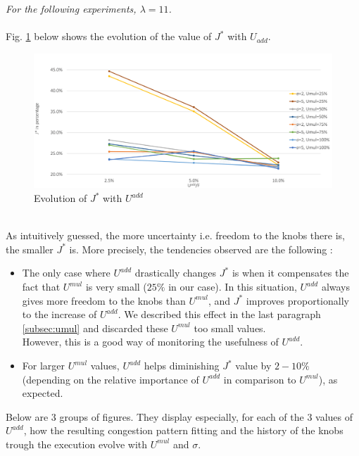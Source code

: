 \emph{For the following experiments, $\lambda=11$.}\\
\\
Fig. \ref{fig:uaddevolution} below shows the evolution of the value of $J^{*}$ with $U_{add}$.\\
\begin{figure}[h]
	\label{fig:uaddevolution}
	\caption{Evolution of $J^{*}$ with $U^{add}$}
	\includegraphics[width=7in]{figures/uadd.png}
\end{figure}
\\
As intuitively guessed, the more uncertainty i.e. freedom to the knobs there is, the smaller $J^{*}$ is.
More precisely, the tendencies observed are the following :\\
\begin{itemize}
	\item The only case where $U^{add}$ drastically changes $J^{*}$ is when it compensates the fact that $U^{mul}$ is very small ($25\% $ in our case). In this situation, $U^{add}$ always gives more freedom to the knobs than $U^{mul}$, and $J^{*}$ improves proportionally to the increase of $U^{add}$. We described this effect in the last paragraph \ref{subsec:umul} and discarded these $U^{mul}$ too small values.\\
However, this is a good way of monitoring the usefulness of $U^{add}$.
	\item For larger $U^{mul}$ values, $U^{add}$ helps diminishing $J^{*}$ value by $2-10 \% $ (depending on the relative importance of $U^{add}$ in comparison to $U^{mul}$), as expected.
\end{itemize}
Below are 3 groups of figures. They display especially, for each of the 3 values of $U^{add}$, how the resulting congestion pattern fitting and the history of the knobs trough the execution evolve with $U^{mul}$ and $\sigma$.\\
